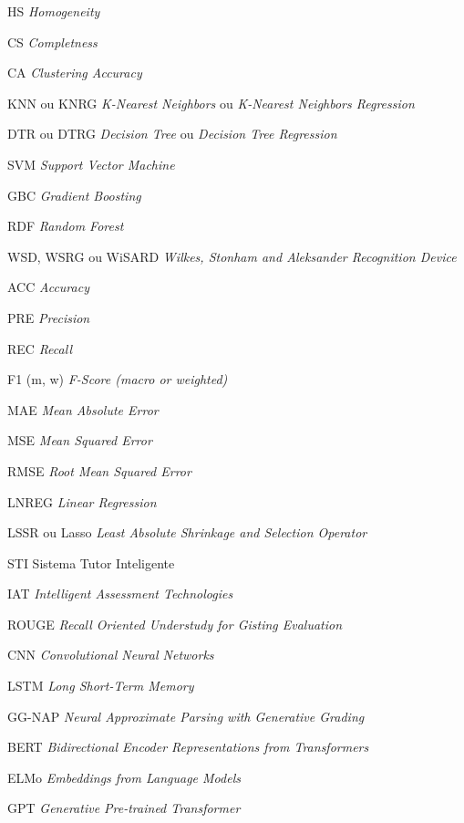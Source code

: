 \documentclass[
	12pt,				%
	openright,			%
	twoside,			%
	a4paper,			%
	english,			%
	french,				%
	spanish,			%
	brazil				%
	]{abntex2}
\begin{document}
\begin{siglas}
  \item[HS] \textit{Homogeneity}
  \item[CS] \textit{Completness}
  \item[CA] \textit{Clustering Accuracy}
  \item[KNN ou KNRG] \textit{K-Nearest Neighbors} ou \textit{K-Nearest Neighbors Regression}
  \item[DTR ou DTRG] \textit{Decision Tree} ou \textit{Decision Tree Regression}
  \item[SVM] \textit{Support Vector Machine}
  \item[GBC] \textit{Gradient Boosting}
  \item[RDF] \textit{Random Forest}
  \item[WSD, WSRG ou WiSARD] \textit{Wilkes, Stonham and Aleksander Recognition Device}
  \item[ACC] \textit{Accuracy}
  \item[PRE] \textit{Precision}
  \item[REC] \textit{Recall}
  \item[F1 (m, w)] \textit{F-Score (macro or weighted)}
  \item[MAE] \textit{Mean Absolute Error}
  \item[MSE] \textit{Mean Squared Error}
  \item[RMSE] \textit{Root Mean Squared Error}
  \item[LNREG] \textit{Linear Regression}
  \item[LSSR ou Lasso] \textit{Least Absolute Shrinkage and Selection Operator}
  \item[STI] Sistema Tutor Inteligente
  \item[IAT] \textit{Intelligent Assessment Technologies}
  \item[ROUGE] \textit{Recall Oriented Understudy for Gisting Evaluation}
  \item[CNN] \textit{Convolutional Neural Networks}
  \item[LSTM] \textit{Long Short-Term Memory}
  \item[GG-NAP] \textit{Neural Approximate Parsing with Generative Grading}
  \item[BERT] \textit{Bidirectional Encoder Representations from Transformers}
  \item[ELMo] \textit{Embeddings from Language Models}
  \item[GPT] \textit{Generative Pre-trained Transformer}
\end{siglas}
\end{document}
